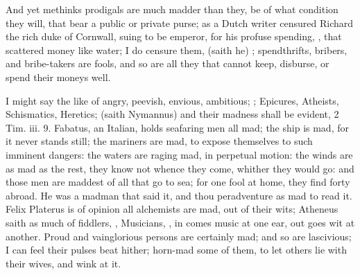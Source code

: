 {And yet methinks prodigals are much madder than they, be of what
condition they will, that bear a public or private purse; as a
Dutch writer censured Richard the rich duke of Cornwall, suing to
be emperor, for his profuse spending, , that scattered money like water; I do
censure them,  (saith he) ; spendthrifts, bribers, and bribe-takers are fools, and so
are all they that cannot keep, disburse, or spend their moneys
well.

I might say the like of angry, peevish, envious, ambitious; 
; Epicures, Atheists, Schismatics,
Heretics;  (saith Nymannus) and
their madness shall be evident, 2 Tim. iii. 9. Fabatus, an
Italian, holds seafaring men all mad; the ship is mad, for it never
stands still; the mariners are mad, to expose themselves to such
imminent dangers: the waters are raging mad, in perpetual motion: the
winds are as mad as the rest, they know not whence they come, whither
they would go: and those men are maddest of all that go to sea; for one
fool at home, they find forty abroad. He was a madman that said it, and
thou peradventure as mad to read it.  Felix Platerus is of opinion
all alchemists are mad, out of their wits; Atheneus saith as much
of fiddlers, ,  Musicians, , in comes music at one
ear, out goes wit at another. Proud and vainglorious persons are
certainly mad; and so are lascivious; I can feel their pulses beat
hither; horn-mad some of them, to let others lie with their wives, and
wink at it.

}
